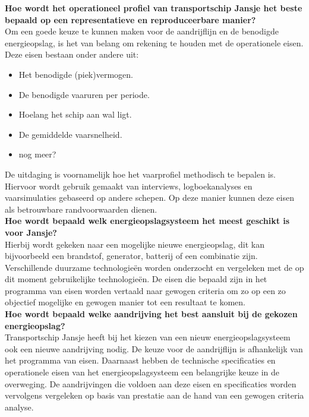 \noindent \textbf{Hoe wordt het operationeel profiel van transportschip Jansje het beste bepaald op een representatieve en reproduceerbare manier?} \\
    Om een goede keuze te kunnen maken voor de aandrijflijn en de benodigde energieopslag, is het van belang om rekening te houden met de operationele eisen. Deze eisen bestaan onder andere uit:
    \begin{itemize}
        \item Het benodigde (piek)vermogen.
        \item De benodigde vaaruren per periode.
        \item Hoelang het schip aan wal ligt.
        \item De gemiddelde vaarsnelheid.
        \item nog meer?
    \end{itemize}
    De uitdaging is voornamelijk hoe het vaarprofiel methodisch te bepalen is. Hiervoor wordt gebruik gemaakt van interviews, logboekanalyses en vaarsimulaties gebaseerd op andere schepen. Op deze manier kunnen deze eisen als betrouwbare randvoorwaarden dienen.\\
    
\noindent\textbf{Hoe wordt bepaald welk energieopslagsysteem het meest geschikt is voor Jansje?}\\
    Hierbij wordt gekeken naar een mogelijke nieuwe energieopslag, dit kan bijvoorbeeld een brandstof, generator, batterij of een combinatie zijn. Verschillende duurzame technologieën worden onderzocht en vergeleken met de op dit moment gebruikelijke technologieën. De eisen die bepaald zijn in het programma van eisen worden vertaald naar gewogen criteria om zo op een zo objectief mogelijke en gewogen manier tot een resultaat te komen.\\
    
\noindent\textbf{Hoe wordt bepaald welke aandrijving het best aansluit bij de gekozen energieopslag?}\\
    Transportschip Jansje heeft bij het kiezen van een nieuw energieopslagsysteem ook een nieuwe aandrijving nodig. De keuze voor de aandrijflijn is afhankelijk van het programma van eisen. Daarnaast hebben de technische specificaties en operationele eisen van het energieopslagsysteem een belangrijke keuze in de overweging. De aandrijvingen die voldoen aan deze eisen en specificaties worden vervolgens vergeleken op basis van prestatie aan de hand van een gewogen criteria analyse. \\

